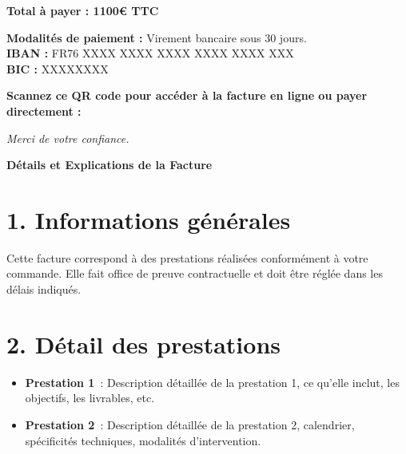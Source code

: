 \documentclass[12pt,a4paper]{article}
\begin{document}
\vspace{0.8cm}

\noindent
\textbf{Total à payer : 1100€ TTC}

\vspace{0.8cm}

\noindent
\textbf{Modalités de paiement :} Virement bancaire sous 30 jours.\\
\textbf{IBAN :} FR76 XXXX XXXX XXXX XXXX XXXX XXX \\
\textbf{BIC :} XXXXXXXX \\

\vspace{1cm}

\begin{minipage}{0.45\textwidth}
    \textbf{Scannez ce QR code pour accéder à la facture en ligne ou payer directement :}
\end{minipage}
\hfill
\begin{minipage}{0.5\textwidth}
\end{minipage}

\vfill

\textit{Merci de votre confiance.}

\newpage

{\Huge \textbf{Détails et Explications de la Facture}}

\vspace{1cm}

\section*{1. Informations générales}
Cette facture correspond à des prestations réalisées conformément à votre commande. Elle fait office de preuve contractuelle et doit être réglée dans les délais indiqués.

\section*{2. Détail des prestations}
\begin{itemize}
    \item \textbf{Prestation 1} : Description détaillée de la prestation 1, ce qu’elle inclut, les objectifs, les livrables, etc.
    \item \textbf{Prestation 2} : Description détaillée de la prestation 2, calendrier, spécificités techniques, modalités d’intervention.
\end{itemize}
\end{document}
